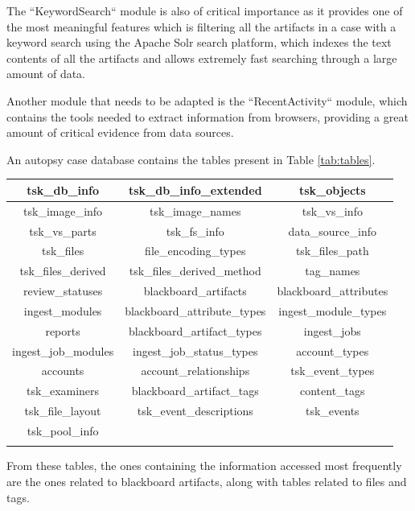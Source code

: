 The ``KeywordSearch`` module is also of critical importance as it provides one of the most meaningful features which is filtering all the artifacts in a case with a keyword
search using the Apache Solr search platform, which indexes the text contents of all the artifacts and allows extremely fast searching through a large amount of data.  

Another module that needs to be adapted is the ``RecentActivity`` module, which contains the tools needed to extract information from browsers, providing a great amount of
critical evidence from data sources.

An autopsy case database contains the tables present in Table \ref{tab:tables}.

\begin{tabularx}{\textwidth}{|c|c|c|}
    \hline
    tsk\_db\_info & tsk\_db\_info\_extended & tsk\_objects \\
    \hline
    tsk\_image\_info & tsk\_image\_names & tsk\_vs\_info \\
    \hline
    tsk\_vs\_parts & tsk\_fs\_info & data\_source\_info \\
    \hline
    tsk\_files & file\_encoding\_types & tsk\_files\_path \\
    \hline
    tsk\_files\_derived & tsk\_files\_derived\_method & tag\_names \\
    \hline
    review\_statuses & blackboard\_artifacts & blackboard\_attributes \\
    \hline
    ingest\_modules & blackboard\_attribute\_types & ingest\_module\_types \\
    \hline
    reports & blackboard\_artifact\_types & ingest\_jobs \\
    \hline
    ingest\_job\_modules & ingest\_job\_status\_types & account\_types \\
    \hline
    accounts & account\_relationships & tsk\_event\_types \\
    \hline
    tsk\_examiners & blackboard\_artifact\_tags & content\_tags \\
    \hline
    tsk\_file\_layout & tsk\_event\_descriptions & tsk\_events \\
    \hline
    tsk\_pool\_info & & \\
    \hline
    \caption{Case Database Tables}
    \label{tab:tables}
\end{tabularx}

From these tables, the ones containing the information accessed most frequently are the ones related to blackboard artifacts, along with tables related to files and tags.

